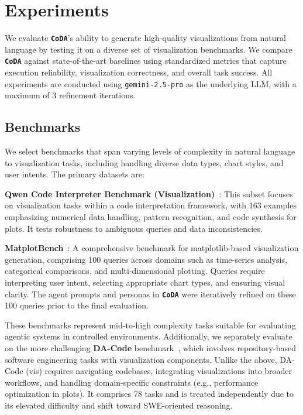 \documentclass[11pt, a4paper, logo, copyright]{googlecloud}
\newcommand{\methodname}{\textbf{\texttt{\textcolor{StarIndigo}{C}\textcolor{StarIndigo}{o}\textcolor{StarCoral}{D}\textcolor{StarTeal}{A}}}}
\newcommand{\io}[1]{\setlength{\fboxsep}{1pt}\colorbox{gray!10}{\texttt{#1}}}
\begin{document}
\section{Experiments}\label{sec:exp}

We evaluate \methodname{}'s ability to generate high-quality visualizations from natural language by testing it on a diverse set of visualization benchmarks. We compare \methodname{} against state-of-the-art baselines using standardized metrics that capture execution reliability, visualization correctness, and overall task success. All experiments are conducted using \io{gemini-2.5-pro} as the underlying LLM, with a maximum of 3 refinement iterations. 

\subsection{Benchmarks}
We select benchmarks that span varying levels of complexity in natural language to visualization tasks, including handling diverse data types, chart styles, and user intents. The primary datasets are:


\textbf{Qwen Code Interpreter Benchmark (Visualization)}~\citep{Yang2025Qwen3TR}:
This subset focuses on visualization tasks within a code interpretation framework, with 163 examples emphasizing numerical data handling, pattern recognition, and code synthesis for plots. It tests robustness to ambiguous queries and data inconsistencies.

\textbf{MatplotBench}~\citep{yang2024matplotagent}:
A comprehensive benchmark for matplotlib-based visualization generation, comprising 100 queries across domains such as time-series analysis, categorical comparisons, and multi-dimensional plotting. Queries require interpreting user intent, selecting appropriate chart types, and ensuring visual clarity. The agent prompts and personas in \methodname{} were iteratively refined on these 100 queries prior to the final evaluation.


These benchmarks represent mid-to-high complexity tasks suitable for evaluating agentic systems in controlled environments.
Additionally, we separately evaluate on the more challenging \textbf{DA-Code} benchmark~\citep{Huang2024DACodeAD}, which involves repository-based software engineering tasks with visualization components. Unlike the above, DA-Code (vis) requires navigating codebases, integrating visualizations into broader workflows, and handling domain-specific constraints (e.g., performance optimization in plots). It comprises 78 tasks and is treated independently due to its elevated difficulty and shift toward SWE-oriented reasoning.
\end{document}

